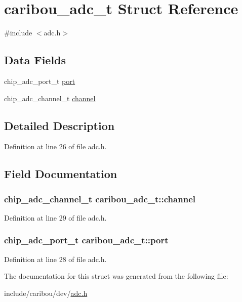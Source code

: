 \hypertarget{structcaribou__adc__t}{\section{caribou\-\_\-adc\-\_\-t Struct Reference}
\label{structcaribou__adc__t}
}


{\ttfamily \#include $<$adc.\-h$>$}

\subsection*{Data Fields}
\begin{DoxyCompactItemize}
\item 
chip\-\_\-adc\-\_\-port\-\_\-t \hyperlink{structcaribou__adc__t_a81d68d4d24e7fd693a001d92a96a2e52}{port}
\item 
chip\-\_\-adc\-\_\-channel\-\_\-t \hyperlink{structcaribou__adc__t_ad7e1d6b340173ec1b982221bfd888a4c}{channel}
\end{DoxyCompactItemize}


\subsection{Detailed Description}


Definition at line 26 of file adc.\-h.



\subsection{Field Documentation}
\hypertarget{structcaribou__adc__t_ad7e1d6b340173ec1b982221bfd888a4c}{
\subsubsection[{channel}]{\setlength{\rightskip}{0pt plus 5cm}chip\-\_\-adc\-\_\-channel\-\_\-t caribou\-\_\-adc\-\_\-t\-::channel}}\label{structcaribou__adc__t_ad7e1d6b340173ec1b982221bfd888a4c}


Definition at line 29 of file adc.\-h.

\hypertarget{structcaribou__adc__t_a81d68d4d24e7fd693a001d92a96a2e52}{
\subsubsection[{port}]{\setlength{\rightskip}{0pt plus 5cm}chip\-\_\-adc\-\_\-port\-\_\-t caribou\-\_\-adc\-\_\-t\-::port}}\label{structcaribou__adc__t_a81d68d4d24e7fd693a001d92a96a2e52}


Definition at line 28 of file adc.\-h.



The documentation for this struct was generated from the following file\-:\begin{DoxyCompactItemize}
\item 
include/caribou/dev/\hyperlink{adc_8h}{adc.\-h}\end{DoxyCompactItemize}
